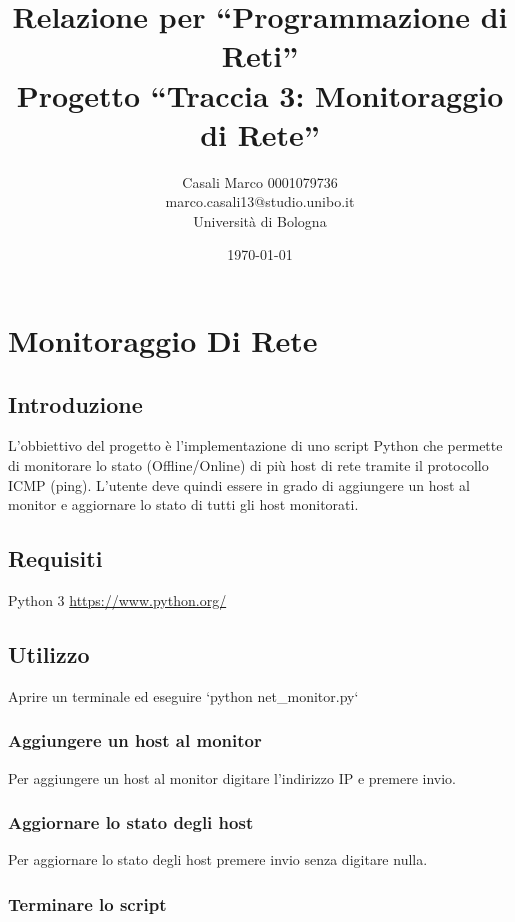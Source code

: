 \documentclass[a4paper,12pt]{report}
\title{Relazione per ``Programmazione di Reti'' \\Progetto ``Traccia 3: Monitoraggio di Rete''}
\author{Casali Marco 0001079736 \\ marco.casali13@studio.unibo.it \\ Università di Bologna}
\date{\today}
\begin{document}
\maketitle

\tableofcontents

\chapter{Monitoraggio Di Rete}

\section{Introduzione}

L'obbiettivo del progetto è l'implementazione di uno script Python che permette di monitorare lo 
stato (Offline/Online) di più host di rete tramite il protocollo ICMP (ping).
L'utente deve quindi essere in grado di aggiungere un host al monitor e aggiornare lo stato 
di tutti gli host monitorati.

\section{Requisiti}

Python 3 \url{https://www.python.org/}

\section{Utilizzo}

Aprire un terminale ed eseguire `python net\_monitor.py`

\subsection{Aggiungere un host al monitor}

Per aggiungere un host al monitor digitare l'indirizzo IP
e premere invio.

\subsection{Aggiornare lo stato degli host}

Per aggiornare lo stato degli host premere invio senza digitare
nulla.

\subsection{Terminare lo script}
\end{document}

